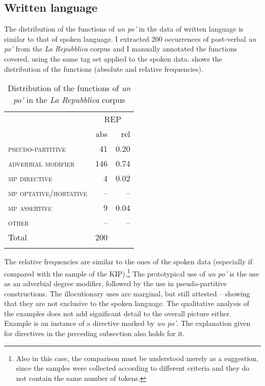\subsection{Written language}
\hypertarget{Toc124860664}{}
The distribution of the functions of \textit{un po’} in the data of written language is similar to that of spoken language. I extracted 200 occurrences of post-verbal \textit{un po’} from the \textit{La Repubblica} corpus and I manually annotated the functions covered, using the same tag set applied to the spoken data.  shows the distribution of the functions (absolute and relative frequencies).
\largerpage[2]

\begin{table}
\begin{tabularx}{0.8\textwidth}{Xr@{\qquad}r}
\lsptoprule
 & \multicolumn{2}{c}{REP}\\
 \cmidrule{2-3}
  & abs & rel\\
  \midrule
\textsc{pseudo-partitive} & 41 & {0.20}\\
\textsc{adverbial} \textsc{modifier} & 146 & {0.74}\\
\textsc{mp} \textsc{directive} & 4 & {0.02}\\
\textsc{mp} \textsc{optative/hortative} & – & –\\
\textsc{mp} \textsc{assertive} & 9 & {0.04}\\
\textsc{other} & – & –\\
\midrule
Total & 200 & \\
\lspbottomrule
\end{tabularx}
\caption{\label{tab:key:7.3} Distribution of the functions of \textit{un po’} in the \textit{La Repubblica} corpus}
\end{table}

The relative frequencies are similar to the ones of the spoken data (especially if compared with the sample of the KIP).\footnote{Also in this case, the comparison must be understood merely as a suggestion, since the samples were collected according to different criteria and they do not contain the same number of tokens.} The prototypical use of \textit{un po’} is the use as an adverbial degree modifier, followed by the use in pseudo-partitive constructions. The illocutionary uses are marginal, but still attested – showing that they are not exclusive to the spoken language. The qualitative analysis of the examples does not add significant detail to the overall picture either. Example  is an instance of a directive marked by \textit{un po’}. The explanation given for directives in the preceding subsection also holds for it.


